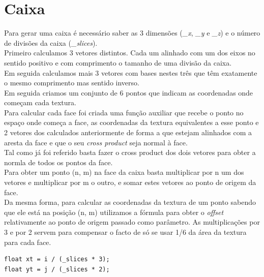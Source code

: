 \documentclass[a4paper]{report}
\begin{document}
\section{Caixa}
Para gerar uma caixa é necessário saber as 3 dimensões (\textit{\_x},
\textit{\_y} e \textit{\_z})  e o número de
divisões da caixa (\textit{\_slices}).\\
Primeiro calculamos 3 vetores distintos. Cada um alinhado com um dos eixos no
sentido positivo e com comprimento o tamanho de uma divisão da caixa.\\
Em seguida calculamos mais 3 vetores com bases nestes três que têm exatamente o
mesmo comprimento mas sentido inverso.\\
Em seguida criamos um conjunto de 6 pontos que indicam as coordenadas onde
começam cada textura.\\
Para calcular cada face foi criada uma função auxiliar que recebe o ponto no
espaço onde começa a face, as coordenadas da textura equivalentes a esse ponto e
2 vetores dos calculados anteriormente de forma a que estejam alinhados com a
aresta da face e que o seu \textit{cross product} seja normal à face.\\
Tal como já foi referido basta fazer o cross product dos dois vetores para obter
a normla de todos os pontos da face.\\
Para obter um ponto (n, m) na face da caixa basta multiplicar por n um dos
vetores e multiplicar por m o outro, e somar estes vetores ao ponto de origem da
face.\\
Da mesma forma, para calcular as coordenadas da textura de um ponto sabendo que
ele está na posição (n, m) utilizamos a fórmula para obter o \textit{offset}
relativamente ao ponto de origem passado como parâmetro. As multiplicações por 3 e
por 2 servem para compensar o facto de só se usar 1/6 da área da textura para
cada face.
\begin{lstlisting}
float xt = i / (_slices * 3);
float yt = j / (_slices * 2);
\end{lstlisting}
\end{document}
